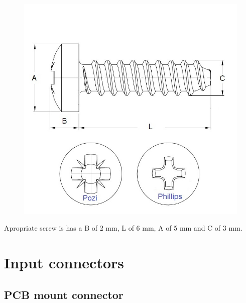 \documentclass[11pt]{article}
\begin{document}
\begin{figure}[H]
  \centering 
  \includegraphics[scale=0.4]{"./figs/screw_sizez.jpg"}
\end{figure}

Apropriate screw is has a B of 2 mm, L of 6 mm, A of 5 mm and C of 3 mm. 

\section{Input connectors}

\subsection{PCB mount connector}
\end{document}
